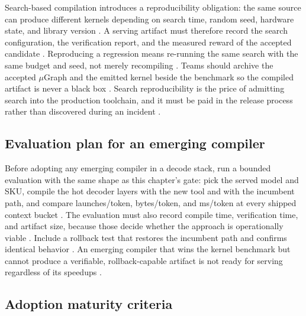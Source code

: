 Search-based compilation introduces a reproducibility obligation: the same source can produce different kernels depending on search time, random seed, hardware state, and library version \citep{wu2024mirage,chen2020compilerbasedhardw}. A serving artifact must therefore record the search configuration, the verification report, and the measured reward of the accepted candidate \citep{memoryfloor2026,patel2025llminference}. Reproducing a regression means re-running the same search with the same budget and seed, not merely recompiling \citep{wu2024mirage,taxbreak2026}. Teams should archive the accepted $\mu$Graph and the emitted kernel beside the benchmark so the compiled artifact is never a black box \citep{chen2020compilerbasedhardw,memoryfloor2026}. Search reproducibility is the price of admitting search into the production toolchain, and it must be paid in the release process rather than discovered during an incident \citep{wu2024mirage,patel2025llminference}.

\subsection{Evaluation plan for an emerging compiler}

Before adopting any emerging compiler in a decode stack, run a bounded evaluation with the same shape as this chapter's gate: pick the served model and SKU, compile the hot decoder layers with the new tool and with the incumbent path, and compare launches/token, bytes/token, and ms/token at every shipped context bucket \citep{wu2024mirage,taxbreak2026,memoryfloor2026}. The evaluation must also record compile time, verification time, and artifact size, because those decide whether the approach is operationally viable \citep{wu2024mirage,patel2025llminference}. Include a rollback test that restores the incumbent path and confirms identical behavior \citep{chen2020compilerbasedhardw,memoryfloor2026}. An emerging compiler that wins the kernel benchmark but cannot produce a verifiable, rollback-capable artifact is not ready for serving regardless of its speedups \citep{patel2025llminference,wu2024mirage}.

\subsection{Adoption maturity criteria}

